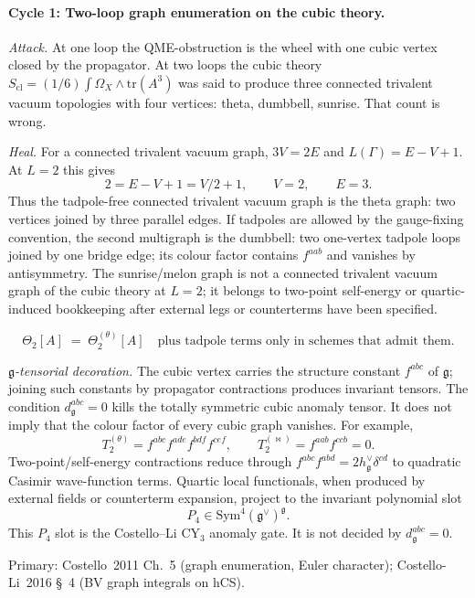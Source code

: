 \documentclass[11pt]{amsart}
\theoremstyle{definition}
\theoremstyle{remark}
\providecommand{\frakg}{\mathfrak{g}}
\providecommand{\Sym}{\mathrm{Sym}}
\providecommand{\tr}{\mathrm{tr}}
\begin{document}
\paragraph{Cycle 1: Two-loop graph enumeration on the cubic theory.}
\emph{Attack.}
At one loop the QME-obstruction is the wheel with one cubic vertex
closed by the propagator. At two loops the cubic theory
$S_{\mathrm{cl}} = (1/6) \int \Omega_X \wedge \tr(A^3)$ was said to
produce three connected trivalent vacuum topologies with four vertices:
theta, dumbbell, sunrise. That count is wrong.

\emph{Heal.}
For a connected trivalent vacuum graph, $3V=2E$ and
$L(\Gamma)=E-V+1$. At $L=2$ this gives
\[
  2=E-V+1=V/2+1,\qquad V=2,\qquad E=3.
\]
Thus the tadpole-free connected trivalent vacuum graph is the theta
graph: two vertices joined by three parallel edges. If tadpoles are
allowed by the gauge-fixing convention, the second multigraph is the
dumbbell: two one-vertex tadpole loops joined by one bridge edge; its
colour factor contains $f^{aab}$ and vanishes by antisymmetry. The
sunrise/melon graph is not a connected trivalent vacuum graph of the
cubic theory at $L=2$; it belongs to two-point self-energy or
quartic-induced bookkeeping after external legs or counterterms have
been specified.

\[
  \Theta_2[A] \;=\; \Theta_2^{(\theta)}[A]
  \quad \text{plus tadpole terms only in schemes that admit them.}
\]

\emph{$\frakg$-tensorial decoration.}
The cubic vertex carries the structure constant $f^{abc}$ of $\frakg$;
joining such constants by propagator contractions produces invariant
tensors. The condition $d^{abc}_\frakg=0$ kills the totally symmetric
cubic anomaly tensor. It does not imply that the colour factor of every
cubic graph vanishes. For example,
\[
  T^{(\theta)}_2 = f^{abc} f^{ade} f^{bdf} f^{cef}, \qquad
  T^{(\bowtie)}_2 = f^{aab} f^{ccb}=0.
\]
Two-point/self-energy contractions reduce through
$f^{abc}f^{abd}=2h^\vee_\frakg\delta^{cd}$ to quadratic Casimir
wave-function terms. Quartic local functionals, when produced by
external fields or counterterm expansion, project to the invariant
polynomial slot
\[
  P_4\in\Sym^4(\frakg^\vee)^\frakg .
\]
This $P_4$ slot is the Costello--Li CY$_3$ anomaly gate. It is not
decided by $d^{abc}_\frakg=0$.

Primary: Costello~2011 Ch.~5 (graph enumeration, Euler character);
Costello-Li~2016 \S~4 (BV graph integrals on hCS).
\end{document}
